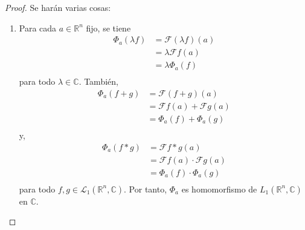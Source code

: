 \documentclass[12pt]{report}
\theoremstyle{largebreak}
\newcommand{\fou}[1]{\ensuremath{\mathcal{F}#1}}
\begin{document}
    \begin{proof}
        Se harán varias cosas:
        \begin{enumerate}
            \item Para cada $a\in\mathbb{R}^n$ fijo, se tiene
            \begin{equation*}
                \begin{split}
                    \Phi_a(\lambda f)&=\fou{(\lambda f)}(a)\\
                    &=\lambda\fou{f}(a)\\
                    &=\lambda\Phi_a(f)\\
                \end{split}
            \end{equation*}
            para todo $\lambda\in\mathbb{C}$. También,
            \begin{equation*}
                \begin{split}
                    \Phi_a(f+g)&=\fou{(f+g)}(a)\\
                    &=\fou{f}(a)+\fou{g}(a)\\
                    &=\Phi_a(f)+\Phi_a(g)\\
                \end{split}
            \end{equation*}
            y,
            \begin{equation*}
                \begin{split}
                    \Phi_a(f*g)&=\fou{f*g}(a)\\
                    &=\fou{f}(a)\cdot\fou{g}(a)\\
                    &=\Phi_a(f)\cdot\Phi_a(g)\\
                \end{split}
            \end{equation*}
            para todo $f,g\in\mathcal{L}_1(\mathbb{R}^n,\mathbb{C})$. Por tanto, $\Phi_a$ es homomorfismo de $L_1(\mathbb{R}^n,\mathbb{C})$ en $\mathbb{C}$.


\end{enumerate}
\end{proof}
\end{document}
